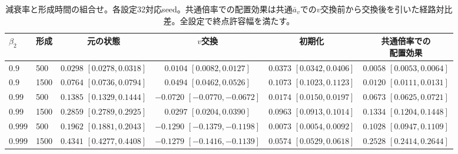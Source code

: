 \begin{table}[ht]
\centering\small
\caption{減衰率と形成時間の組合せ。各設定32対応seed。共通倍率での配置効果は共通$\bar a_v$での$v$交換前から交換後を引いた経路対比差。全設定で終点許容幅を満たす。}
\label{tab:ivfbeta}
\begin{tabular}{llcccc}
\toprule
$\beta_2$ & 形成 & 元の状態 & $v$交換 & 初期化 & \shortstack{共通倍率での\\配置効果}\\
\midrule
$0.9$ & 500 & \shortstack{$0.0298$\\$[0.0278,0.0318]$} & \shortstack{$0.0104$\\$[0.0082,0.0127]$} & \shortstack{$0.0373$\\$[0.0342,0.0406]$} & \shortstack{$0.0058$\\$[0.0053,0.0064]$} \\
$0.9$ & 1500 & \shortstack{$0.0764$\\$[0.0736,0.0794]$} & \shortstack{$0.0494$\\$[0.0462,0.0526]$} & \shortstack{$0.1073$\\$[0.1023,0.1123]$} & \shortstack{$0.0120$\\$[0.0111,0.0131]$} \\
$0.99$ & 500 & \shortstack{$0.1385$\\$[0.1329,0.1444]$} & \shortstack{$-0.0720$\\$[-0.0770,-0.0672]$} & \shortstack{$0.0174$\\$[0.0150,0.0197]$} & \shortstack{$0.0673$\\$[0.0625,0.0721]$} \\
$0.99$ & 1500 & \shortstack{$0.2859$\\$[0.2789,0.2925]$} & \shortstack{$0.0297$\\$[0.0204,0.0390]$} & \shortstack{$0.0963$\\$[0.0913,0.1014]$} & \shortstack{$0.1334$\\$[0.1204,0.1448]$} \\
$0.999$ & 500 & \shortstack{$0.1962$\\$[0.1881,0.2043]$} & \shortstack{$-0.1290$\\$[-0.1379,-0.1198]$} & \shortstack{$0.0073$\\$[0.0054,0.0092]$} & \shortstack{$0.1028$\\$[0.0947,0.1109]$} \\
$0.999$ & 1500 & \shortstack{$0.4341$\\$[0.4277,0.4408]$} & \shortstack{$-0.1279$\\$[-0.1416,-0.1139]$} & \shortstack{$0.0574$\\$[0.0529,0.0618]$} & \shortstack{$0.2528$\\$[0.2414,0.2644]$} \\
\bottomrule
\end{tabular}

\end{table}

